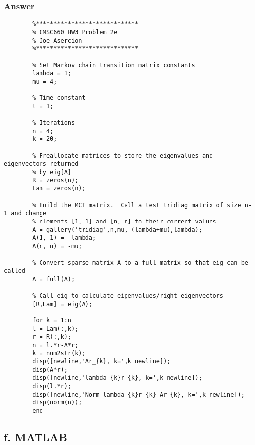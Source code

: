\documentclass{article}
\begin{document}
		\subsubsection{Answer}
		\begin{lstlisting}
		%*****************************
		% CMSC660 HW3 Problem 2e
		% Joe Asercion
		%***************************** 
		
		% Set Markov chain transition matrix constants
		lambda = 1;
		mu = 4;
		
		% Time constant
		t = 1;
		
		% Iterations
		n = 4;
		k = 20;
		
		% Preallocate matrices to store the eigenvalues and eigenvectors returned 
		% by eig[A]
		R = zeros(n);
		Lam = zeros(n);
		
		% Build the MCT matrix.  Call a test tridiag matrix of size n-1 and change
		% elements [1, 1] and [n, n] to their correct values.
		A = gallery('tridiag',n,mu,-(lambda+mu),lambda);
		A(1, 1) = -lambda;
		A(n, n) = -mu;
		
		% Convert sparse matrix A to a full matrix so that eig can be called
		A = full(A);
		
		% Call eig to calculate eigenvalues/right eigenvectors
		[R,Lam] = eig(A);
		
		for k = 1:n
		l = Lam(:,k);
		r = R(:,k);
		n = l.*r-A*r;
		k = num2str(k);
		disp([newline,'Ar_{k}, k=',k newline]);
		disp(A*r);
		disp([newline,'lambda_{k}r_{k}, k=',k newline]);
		disp(l.*r);
		disp([newline,'Norm lambda_{k}r_{k}-Ar_{k}, k=',k newline]);
		disp(norm(n));
		end
		\end{lstlisting}
		\newpage
		\subsection{f. MATLAB}
\end{document}
